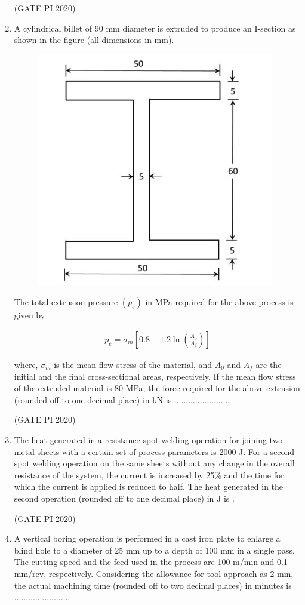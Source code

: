 \documentclass[journal,12pt,onecolumn]{IEEEtran}
\theoremstyle{remark}
\begin{document}
\begin{enumerate}
\hfill (GATE PI 2020)

\item A cylindrical billet of 90 mm diameter is extruded to produce an I-section as shown in the figure (all dimensions in mm).
\begin{figure}[h]
    \centering
    \includegraphics[width=0.5\columnwidth]{figs/fig17.png}
    \caption{}
    \label{fig:placeholder}
\end{figure}

The total extrusion pressure $(p_e)$ in MPa required for the above process is given by

\begin{align*}
p_e = \sigma_m \left[ 0.8 + 1.2 \ln \left( \frac{A_0}{A_f} \right) \right]
\end{align*}

where, $\sigma_m$ is the mean flow stress of the material, and $A_0$ and $A_f$ are the initial and the final cross-sectional areas, respectively. If the mean flow stress of the extruded material is 80 MPa, the force required for the above extrusion (rounded off to one decimal place) in kN is ........................

\hfill (GATE PI 2020)

\item The heat generated in a resistance spot welding operation for joining two metal sheets with a certain set of process parameters is 2000 J. For a second spot welding operation on the same sheets without any change in the overall resistance of the system, the current is increased by 25\% and the time for which the current is applied is reduced to half. The heat generated in the second operation (rounded off to one decimal place) in J is .

\hfill (GATE PI 2020)

\item A vertical boring operation is performed in a cast iron plate to enlarge a blind hole to a diameter of 25 mm up to a depth of 100 mm in a single pass. The cutting speed and the feed used in the process are 100 m/min and 0.1 mm/rev, respectively. Considering the allowance for tool approach as 2 mm, the actual machining time (rounded off to two decimal places) in minutes is ........................


\end{enumerate}
\end{document}
